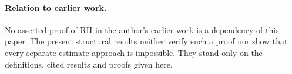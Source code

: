 \paragraph{Relation to earlier work.}
No asserted proof of RH in the author's earlier work is a dependency
of this paper. The present structural results neither verify such a
proof nor show that every separate-estimate approach is impossible.
They stand only on the definitions, cited results and proofs given
here.

